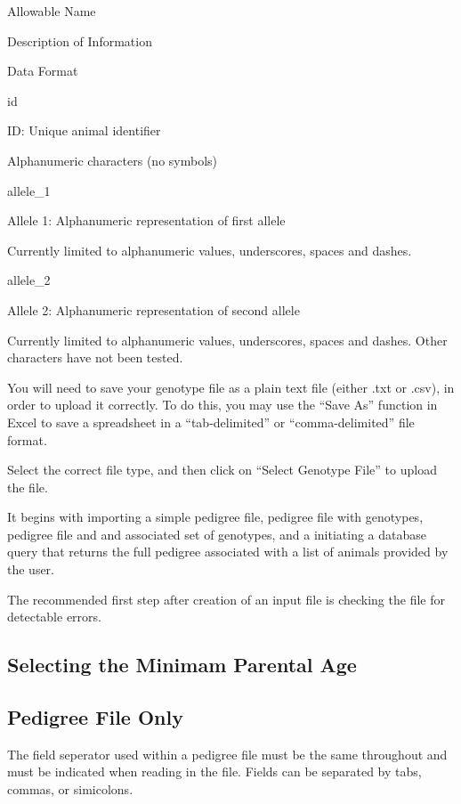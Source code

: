 \documentclass[]{article}
\begin{document}
Allowable Name

Description of Information

Data Format

id

ID: Unique animal identifier

Alphanumeric characters (no symbols)

allele\_1

Allele 1: Alphanumeric representation of first allele

Currently limited to alphanumeric values, underscores, spaces and
dashes.

allele\_2

Allele 2: Alphanumeric representation of second allele

Currently limited to alphanumeric values, underscores, spaces and
dashes. Other characters have not been tested.

You will need to save your genotype file as a plain text file (either
.txt or .csv), in order to upload it correctly. To do this, you may use
the ``Save As'' function in Excel to save a spreadsheet in a
``tab-delimited'' or ``comma-delimited'' file format.

Select the correct file type, and then click on ``Select Genotype File''
to upload the file.

It begins with importing a simple pedigree file, pedigree file with
genotypes, pedigree file and and associated set of genotypes, and a
initiating a database query that returns the full pedigree associated
with a list of animals provided by the user.

The recommended first step after creation of an input file is checking
the file for detectable errors.

\hypertarget{selecting-the-minimam-parental-age}{%
\subsection{Selecting the Minimam Parental
Age}\label{selecting-the-minimam-parental-age}}

\hypertarget{pedigree-file-only}{%
\subsection{Pedigree File Only}\label{pedigree-file-only}}

The field seperator used within a pedigree file must be the same
throughout and must be indicated when reading in the file. Fields can be
separated by tabs, commas, or simicolons.
\end{document}
